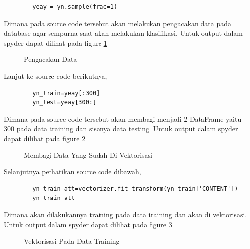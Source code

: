 \begin{enumerate}
	\begin{verbatim}
		yeay = yn.sample(frac=1)
	\end{verbatim}

Dimana pada source code tersebut akan melakukan pengacakan data pada database agar sempurna saat akan melakukan klasifikasi. Untuk output dalam spyder dapat dilihat pada figure \ref{YNC4-13}

	\begin{figure}[ht]
		\caption{Pengacakan Data}
		\label{YNC4-13}
	\end{figure}

Lanjut ke source code berikutnya,

	\begin{verbatim}
		yn_train=yeay[:300]
		yn_test=yeay[300:]
	\end{verbatim}

Dimana pada source code tersebut akan membagi menjadi 2 DataFrame yaitu 300 pada data training dan sisanya data testing. Untuk output dalam spyder dapat dilihat pada figure \ref{YNC4-14}

	\begin{figure}[ht]
		\caption{Membagi Data Yang Sudah Di Vektorisasi}
		\label{YNC4-14}
	\end{figure}

Selanjutnya perhatikan source code dibawah,

	
	\begin{verbatim}
		yn_train_att=vectorizer.fit_transform(yn_train['CONTENT'])
		yn_train_att
	\end{verbatim}

Dimana akan dilakukannya training pada data training dan akan di vektorisasi.  Untuk output dalam spyder dapat dilihat pada figure \ref{YNC4-15}

	\begin{figure}[ht]
		\caption{Vektorisasi Pada Data Training}
		\label{YNC4-15}
	\end{figure}


\end{enumerate}
